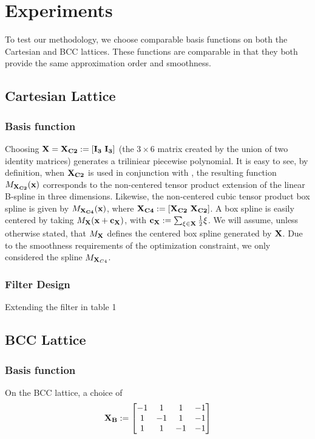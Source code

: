 \section{Experiments}
To test our methodology, we choose comparable basis functions on both the Cartesian and BCC lattices. These functions are comparable in that they both provide the same approximation order and smoothness. 

\subsection{Cartesian Lattice}
\subsubsection{Basis function}
Choosing $\mathbf{\mathbf{X} = \mathbf{X}_{C2} := \left[ I_3  \ I_3 \right]}$ (the $3 \times 6$ matrix created by the union of two identity matrices) generates a triliniear piecewise polynomial. It is easy to see, by definition, when $\mathbf{\mathbf{X}_{C2}}$ is used in conjunction with , the resulting function $M_\mathbf{\mathbf{X}_{C2}}(\mathbf{x})$ corresponds to the non-centered tensor product extension of the linear B-spline in three dimensions. Likewise, the non-centered cubic tensor product box spline is given by $M_\mathbf{\mathbf{X}_{C4}}(\mathbf{x})$, where $\mathbf{\mathbf{X}_{C4} := \left[ \mathbf{X}_{C2} \ \mathbf{X}_{C2} \right]}$. A box spline is easily centered by taking $M_\mathbf{\mathbf{X}}(\mathbf{x} + \mathbf{c_{\mathbf{X}}})$, with $\mathbf{c_{\mathbf{X}}}:=\sum_{\xi \in \mathbf{\mathbf{X}}} \frac{1}{2}\xi$. We will assume, unless otherwise stated, that $M_\mathbf{\mathbf{X}}$ defines the centered box spline generated by $\mathbf{\mathbf{X}}$. Due to the smoothness requirements of the optimization constraint, we only considered the spline $M_{\mathbf{X}_{C4}}$.

\subsubsection{Filter Design}
Extending the filter in table 1

\subsection{BCC Lattice}
\subsubsection{Basis function}
On the BCC lattice, a choice of {\footnotesize
\begin{equation*}
	\mathbf{\mathbf{X}_{B}} := 
	\begin{bmatrix} 
		-1 & 1 & 1 & -1 \\
		1 & -1 & 1 & -1 \\
		1 & 1 & -1 & -1 
	\end{bmatrix}
\end{equation*}}

